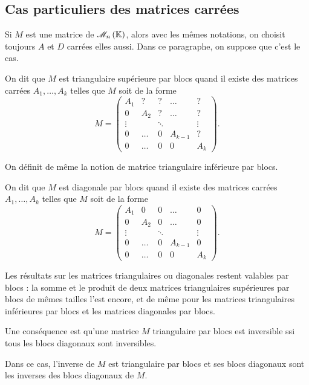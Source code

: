 \subsection{Cas particuliers des matrices carrées}

Si \(M\) est une matrice de \(\M{n}\), alors avec les mêmes notations, on choisit toujours \(A\) et \(D\) carrées elles aussi. Dans ce paragraphe, on suppose que c'est le cas.

\begin{defi}
On dit que \(M\) est triangulaire supérieure par blocs quand il existe des matrices carrées \(A_1,\dots,A_k\) telles que \(M\) soit de la forme \[M=\begin{pmatrix}
A_1 & ? & ? & \dots & ? \\
0 & A_2 & ? & \dots & ? \\
\vdots &  & \ddots &  & \vdots \\
0 & \dots & 0 & A_{k-1} & ? \\
0 & \dots & 0 & 0 & A_k
\end{pmatrix}.\]
\end{defi}

On définit de même la notion de matrice triangulaire inférieure par blocs.

\begin{defi}
On dit que \(M\) est diagonale par blocs quand il existe des matrices carrées \(A_1,\dots,A_k\) telles que \(M\) soit de la forme \[M=\begin{pmatrix}
A_1 & 0 & 0 & \dots & 0 \\
0 & A_2 & 0 & \dots & 0 \\
\vdots &  & \ddots &  & \vdots \\
0 & \dots & 0 & A_{k-1} & 0 \\
0 & \dots & 0 & 0 & A_k
\end{pmatrix}.\]
\end{defi}

Les résultats sur les matrices triangulaires ou diagonales restent valables par blocs : la somme et le produit de deux matrices triangulaires supérieures par blocs de mêmes tailles l'est encore, et de même pour les matrices triangulaires inférieures par blocs et les matrices diagonales par blocs.

Une conséquence est qu'une matrice \(M\) triangulaire par blocs est inversible ssi tous les blocs diagonaux sont inversibles.

Dans ce cas, l'inverse de \(M\) est triangulaire par blocs et ses blocs diagonaux sont les inverses des blocs diagonaux de \(M\).

